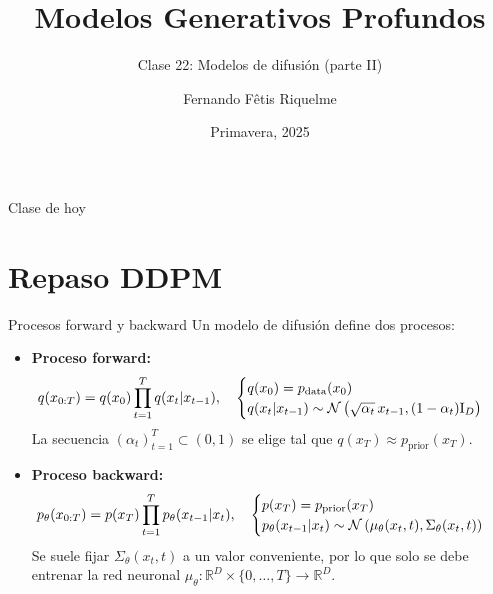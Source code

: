 \documentclass{beamer}
\title{Modelos Generativos Profundos}
\subtitle{Clase 22: Modelos de difusión (parte II)}
\author{Fernando Fêtis Riquelme}
\institute{
    Facultad de Ciencias Físicas y Matemáticas\\
    Universidad de Chile
}
\date{Primavera, 2025}
\newcommand{\R}{\mathbb{R}}
\begin{document}
\begin{frame}
    \titlepage
\end{frame}

\begin{frame}{Clase de hoy}
    \tableofcontents
\end{frame}

\section{Repaso DDPM}

\begin{frame}{Procesos forward y backward}
    Un modelo de difusión define dos procesos:
    \begin{itemize}
        \item \textbf{Proceso forward:}
              \begin{equation*}
                  \hspace{-0.2cm}
                  q(x_{0:T})=q(x_0)\prod_{t=1}^T q(x_t|x_{t-1}),
                  \quad
                  \begin{cases}
                      q(x_0)=p_\text{data}(x_0) \\
                      q(x_t|x_{t-1})\sim\mathcal{N}\left(\sqrt{\alpha_t}\,x_{t-1},(1-\alpha_t)\text{I}_D\right)
                  \end{cases}
              \end{equation*}
              La secuencia $(\alpha_t)_{t=1}^T\subset(0,1)$ se elige tal que $q(x_T)\approx p_{\text{prior}}(x_T)$.
        \item \textbf{Proceso backward:}
              \begin{equation*}
                  \hspace{-0.2cm}
                  p_\theta(x_{0:T})=p(x_T)\prod_{t=1}^T p_\theta(x_{t-1}|x_t),
                  \quad
                  \begin{cases}
                      p(x_T)=p_{\text{prior}}(x_T) \\
                      p_\theta(x_{t-1}|x_t)\sim\mathcal{N}\left(\mu_\theta(x_t,t),\Sigma_\theta(x_t,t)\right)
                  \end{cases}
              \end{equation*}
              Se suele fijar $\Sigma_\theta(x_t,t)$ a un valor conveniente, por lo que solo se debe entrenar la red neuronal $\mu_\theta:\R^D\times\{0,\ldots,T\}\to\R^D$.
    \end{itemize}
\end{frame}
\end{document}
